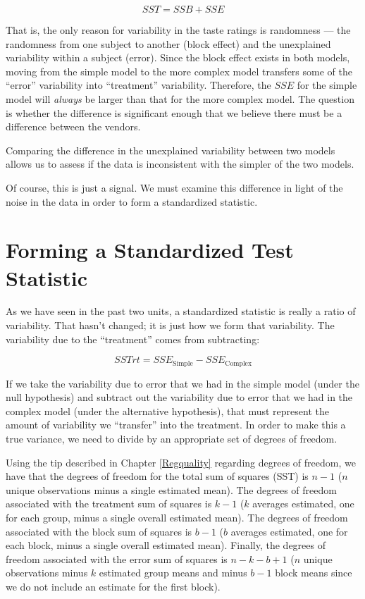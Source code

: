 \documentclass[]{book}
\theoremstyle{plain}
\theoremstyle{mydefn}
\theoremstyle{myexmpl}
\theoremstyle{remark}
\let\BeginKnitrBlock\begin \let\EndKnitrBlock\end
\let\BeginKnitrBlock\begin \let\EndKnitrBlock\end
\begin{document}
\[SST = SSB + SSE\]

That is, the only reason for variability in the taste ratings is
randomness --- the randomness from one subject to another (block effect)
and the unexplained variability within a subject (error). Since the
block effect exists in both models, moving from the simple model to the
more complex model transfers some of the ``error'' variability into
``treatment'' variability. Therefore, the \(SSE\) for the simple model
will \emph{always} be larger than that for the more complex model. The
question is whether the difference is significant enough that we believe
there must be a difference between the vendors.

\BeginKnitrBlock{rmdkeyidea}
Comparing the difference in the unexplained variability between two
models allows us to assess if the data is inconsistent with the simpler
of the two models.
\EndKnitrBlock{rmdkeyidea}

Of course, this is just a signal. We must examine this difference in
light of the noise in the data in order to form a standardized
statistic.

\section{Forming a Standardized Test
Statistic}\label{forming-a-standardized-test-statistic-1}

As we have seen in the past two units, a standardized statistic is
really a ratio of variability. That hasn't changed; it is just how we
form that variability. The variability due to the ``treatment'' comes
from subtracting:

\[SSTrt = SSE_{\text{Simple}} - SSE_{\text{Complex}}\]

If we take the variability due to error that we had in the simple model
(under the null hypothesis) and subtract out the variability due to
error that we had in the complex model (under the alternative
hypothesis), that must represent the amount of variability we
``transfer'' into the treatment. In order to make this a true variance,
we need to divide by an appropriate set of degrees of freedom.

Using the tip described in Chapter \ref{Regquality} regarding degrees of
freedom, we have that the degrees of freedom for the total sum of
squares (SST) is \(n - 1\) (\(n\) unique observations minus a single
estimated mean). The degrees of freedom associated with the treatment
sum of squares is \(k - 1\) (\(k\) averages estimated, one for each
group, minus a single overall estimated mean). The degrees of freedom
associated with the block sum of squares is \(b - 1\) (\(b\) averages
estimated, one for each block, minus a single overall estimated mean).
Finally, the degrees of freedom associated with the error sum of squares
is \(n - k - b + 1\) (\(n\) unique observations minus \(k\) estimated
group means and minus \(b - 1\) block means since we do not include an
estimate for the first block).
\end{document}
